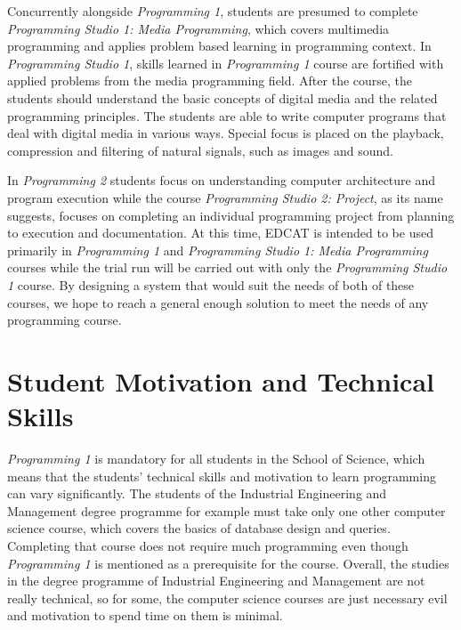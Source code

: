 Concurrently alongside \emph{Programming 1}, students are presumed to complete \emph{Programming Studio 1: Media Programming}, which covers multimedia programming and applies problem based learning in programming context. In \emph{Programming Studio 1}, skills learned in \emph{Programming 1} course are fortified with applied problems from the media programming field. After the course, the students should understand the basic concepts of digital media and the related programming principles. The students are able to write computer programs that deal with digital media in various ways. Special focus is placed on the playback, compression and filtering of natural signals, such as images and sound.

In \emph{Programming 2} students focus on understanding computer architecture and program execution while the course \emph{Programming Studio 2: Project}, as its name suggests, focuses on completing an individual programming project from planning to execution and documentation. At this time, EDCAT is intended to be used primarily in \emph{Programming 1} and \emph{Programming Studio 1: Media Programming} courses while the trial run will be carried out with only the \emph{Programming Studio 1} course. By designing a system that would suit the needs of both of these courses, we hope to reach a general enough solution to meet the needs of any programming course.


\section{Student Motivation and Technical Skills}

\emph{Programming 1} is mandatory for all students in the School of Science, which means that the students' technical skills and motivation to learn programming can vary significantly. The students of the Industrial Engineering and Management degree programme for example must take only one other computer science course, which covers the basics of database design and queries. Completing that course does not require much programming even though \emph{Programming 1} is mentioned as a prerequisite for the course. Overall, the studies in the degree programme of Industrial Engineering and Management are not really technical, so for some, the computer science courses are just necessary evil and motivation to spend time on them is minimal.

